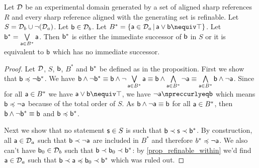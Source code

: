 \documentclass[11pt,letterpaper,fleqn]{memoir} %
\begin{document}
\begin{mathSection}
\begin{prop}
	Let $\edomain$ be an experimental domain generated by a set of aligned sharp references $R$ and every sharp reference aligned with the generating set is refinable. Let $S=\edomain_b \cup \NOT (\edomain_a)$. Let $\stmt[b] \in \edomain_b$. Let $B^*=\{\stmt[a] \in \edomain_a \, | \, \stmt[a] \OR \stmt[b] \nequiv \tautology \}$. Let $\stmt[b]^*=\bigOR\limits_{\stmt[a] \in B^*} \stmt[a]$. Then $\stmt[b]^*$ is either the immediate successor of $\stmt[b]$ in $S$ or it is equivalent to $\stmt[b]$ which has no immediate successor.
\end{prop}
\begin{proof}
	Let $\edomain$, $S$, $\stmt[b]$, $B^*$ and $\stmt[b]^*$ be defined as in the proposition. First we show that $\stmt[b] \narrower \NOT \stmt[b]^*$. We have $\stmt[b] \AND \NOT \stmt[b]^* \equiv \stmt[b] \AND \NOT \bigOR\limits_{\stmt[a] \in B^*} \stmt[a] \equiv \stmt[b] \AND \bigAND\limits_{\stmt[a] \in B^*} \NOT \stmt[a] \equiv \bigAND\limits_{\stmt[a] \in B^*} \stmt[b] \AND \NOT \stmt[a]$. Since for all $\stmt[a] \in B^*$ we have $\stmt[a] \OR \stmt[b] \nequiv \tautology$, we have $\NOT \stmt[a] \nnarrower \stmt[b]$ which means $\stmt[b] \narrower \NOT \stmt[a]$ because of the total order of $S$. As $\stmt[b] \AND \NOT \stmt[a] \equiv \stmt[b]$ for all $\stmt[a] \in B^*$, then $\stmt[b] \AND \NOT \stmt[b]^* \equiv \stmt[b]$ and $\stmt[b] \narrower \stmt[b]^*$.
	
	Next we show that no statement $\stmt[s] \in S$ is such that $\stmt[b] \snarrower \stmt[s] \snarrower \stmt[b]^*$. By construction, all $\stmt[a] \in \edomain_a$ such that $\stmt[b] \snarrower \NOT \stmt[a]$ are included in $B^*$ and therefore $b^* \narrower \NOT \stmt[a]$. We also can't have $\stmt[b]_0 \in \edomain_b$ such that $\stmt[b] \snarrower \stmt[b]_0 \snarrower \stmt[b]^*$: by \ref{prop_refinable_within} we'd find $\stmt[a] \in \edomain_a$ such that $\stmt[b] \snarrower \stmt[a] \narrower \stmt[b]_0 \snarrower \stmt[b]^*$ which was ruled out.
	

\end{proof}
\end{mathSection}
\end{document}
